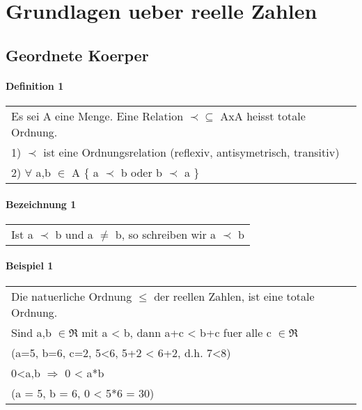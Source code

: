 \documentclass{scrartcl}
\begin{document}
\section{Grundlagen ueber reelle Zahlen}

\subsection{Geordnete Koerper}

\paragraph{Definition 1}
\begin{tabbing}
\begin{tabular}{l}
Es sei A eine Menge. Eine Relation $ \prec \subseteq $ AxA heisst totale Ordnung.\\
1) $ \prec $ ist eine Ordnungsrelation (reflexiv, antisymetrisch, transitiv)\\
2) $ \forall $ a,b $ \in $ A $ \lbrace $ a $ \prec $ b oder b $ \prec $ a $ \rbrace $
\end{tabular}
\end{tabbing}

\paragraph{Bezeichnung 1}
\begin{tabbing}
\begin{tabular}{l}
Ist a $ \prec $ b und a $ \neq $ b, so schreiben wir a $ \prec $ b
\end{tabular}
\end{tabbing}

\paragraph{Beispiel 1}
\begin{tabbing}
\begin{tabular}{l}
Die natuerliche Ordnung $ \leq $ der reellen Zahlen, ist eine totale Ordnung.\\
Sind a,b $ \in \Re $ mit a < b, dann a+c < b+c fuer alle c $ \in \Re$\\
(a=5, b=6, c=2, 5<6, 5+2 < 6+2, d.h. 7<8)\\
0<a,b $ \Rightarrow $ 0 < a*b\\
(a = 5, b = 6, 0 < 5*6 = 30)
\end{tabular}
\end{tabbing}
\end{document}
